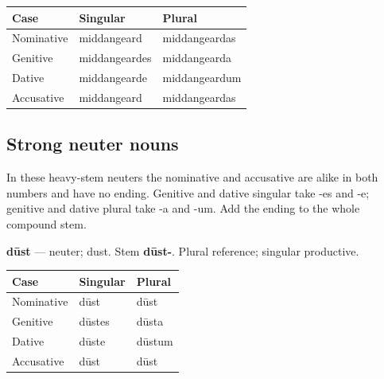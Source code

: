 \par\begingroup
\fontsize{10.5}{13.2}\selectfont
\setlength{\LTleft}{0pt}\setlength{\LTright}{\fill}
\noindent
\begin{tabular}{@{}>{\raggedright\arraybackslash}p{32.88mm}>{\raggedright\arraybackslash}p{42.75mm}>{\raggedright\arraybackslash}p{42.75mm}@{}}
\toprule
\textbf{Case} & \textbf{Singular} & \textbf{Plural} \\
\midrule
Nominative & middangeard & middangeardas \\
Genitive & middangeardes & middangearda \\
Dative & middangearde & middangeardum \\
Accusative & middangeard & middangeardas \\
\bottomrule
\end{tabular}
\par\endgroup

\subsection*{Strong neuter nouns}

In these heavy-stem neuters the nominative and accusative are alike in both numbers and have no ending. Genitive and dative singular take -es and -e; genitive and dative plural take -a and -um. Add the ending to the whole compound stem.

\textbf{dūst} — neuter; dust. Stem \textbf{dūst-}. Plural reference; singular productive.

\par\begingroup
\fontsize{10.5}{13.2}\selectfont
\setlength{\LTleft}{0pt}\setlength{\LTright}{\fill}
\noindent
\begin{tabular}{@{}>{\raggedright\arraybackslash}p{39.46mm}>{\raggedright\arraybackslash}p{39.46mm}>{\raggedright\arraybackslash}p{39.46mm}@{}}
\toprule
\textbf{Case} & \textbf{Singular} & \textbf{Plural} \\
\midrule
Nominative & dūst & dūst \\
Genitive & dūstes & dūsta \\
Dative & dūste & dūstum \\
Accusative & dūst & dūst \\
\bottomrule
\end{tabular}
\par\endgroup

